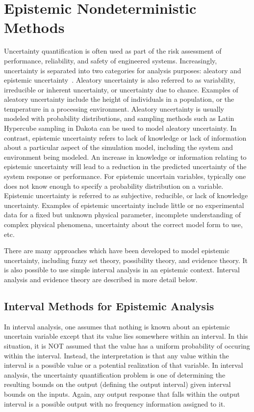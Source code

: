 \section{Epistemic Nondeterministic Methods}\label{uq:epistemic}

Uncertainty quantification is often used as part of the risk
assessment of performance, reliability, and safety of engineered
systems. Increasingly, uncertainty is separated into two categories
for analysis purposes: aleatory and epistemic
uncertainty~\cite{Obe03,Hel07}. Aleatory uncertainty is also referred to as
variability, irreducible or inherent uncertainty, or uncertainty due
to chance. Examples of aleatory uncertainty include the height of
individuals in a population, or the temperature in a processing
environment. Aleatory uncertainty is usually modeled with probability
distributions, and sampling methods such as Latin Hypercube sampling
in Dakota can be used to model aleatory uncertainty. In contrast,
epistemic uncertainty refers to lack of knowledge or lack of
information about a particular aspect of the simulation model,
including the system and environment being modeled. An increase in
knowledge or information relating to epistemic uncertainty will lead
to a reduction in the predicted uncertainty of the system response or
performance. For epistemic uncertain variables, typically one does not
know enough to specify a probability distribution on a variable.
Epistemic uncertainty is referred to as subjective, reducible, or lack
of knowledge uncertainty. Examples of epistemic uncertainty include
little or no experimental data for a fixed but unknown physical
parameter, incomplete understanding of complex physical phenomena,
uncertainty about the correct model form to use, etc.

There are many approaches which have been developed to model epistemic
uncertainty, including fuzzy set theory, possibility theory, and
evidence theory. It is also possible to use simple interval analysis in 
an epistemic context. Interval analysis and evidence theory are 
described in more detail below.

\subsection{Interval Methods for Epistemic Analysis}\label{uq:interval}
In interval analysis, one assumes that nothing is known about 
an epistemic uncertain variable except that its value lies 
somewhere within an interval. In this situation, it is NOT 
assumed that the value has a uniform probability of occuring 
within the interval. Instead, the interpretation is that 
any value within the interval is a possible value or a potential 
realization of that variable. In interval analysis, the 
uncertainty quantification problem is one of determining the 
resulting bounds on the output (defining the output interval) 
given interval bounds on the inputs. Again, any output response 
that falls within the output interval is a possible output 
with no frequency information assigned to it.

